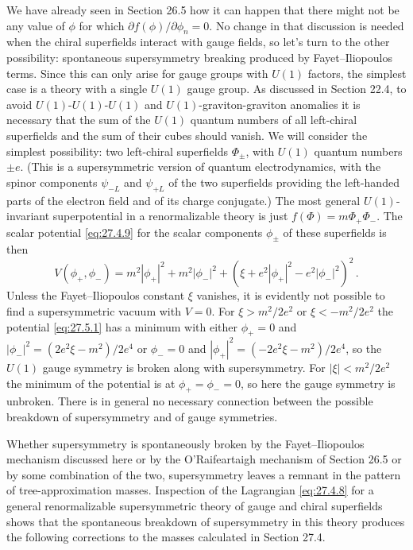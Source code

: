 We have already seen in Section 26.5 how it can happen that there might not
be any value of \(\phi\) for which \(\partial f(\phi)/\partial\phi_n=0\).
No change in that discussion is needed when the chiral superfields interact
with gauge fields, so let's turn to the other possibility: spontaneous
supersymmetry breaking produced by Fayet--Iliopoulos terms. Since this can
only arise for gauge groups with \(U(1)\) factors, the simplest case is a
theory with a single \(U(1)\) gauge group. As discussed in Section 22.4, to
avoid \(U(1)\)-\(U(1)\)-\(U(1)\) and \(U(1)\)-graviton-graviton anomalies
it is necessary that the sum of the \(U(1)\) quantum numbers of all
left-chiral superfields and the sum of their cubes should vanish. We will
consider the simplest possibility: two left-chiral superfields \(\Phi_\pm\),
with \(U(1)\) quantum numbers \(\pm e\). (This is a supersymmetric version
of quantum electrodynamics, with the spinor components \(\psi_{-L}\) and
\(\psi_{+L}\) of the two superfields providing the left-handed parts of the
electron field and of its charge conjugate.) The most general
\(U(1)\)-invariant superpotential in a renormalizable theory is just
\(f(\Phi)=m\Phi_+\Phi_-\). The scalar potential \eqref{eq:27.4.9} for the
scalar components \(\phi_\pm\) of these superfields is then
\begin{equation}
  V(\phi_+,\phi_-)
  =m^2|\phi_+|^2+m^2|\phi_-|^2
  +\left(\xi+e^2|\phi_+|^2-e^2|\phi_-|^2\right)^2\,.
  \tag{27.5.1}\label{eq:27.5.1}
\end{equation}
Unless the Fayet--Iliopoulos constant \(\xi\) vanishes, it is evidently not
possible to find a supersymmetric vacuum with \(V=0\). For
\(\xi>m^2/2e^2\) or \(\xi<-m^2/2e^2\) the potential \eqref{eq:27.5.1} has
a minimum with either \(\phi_+=0\) and
\(|\phi_-|^2=(2e^2\xi-m^2)/2e^4\) or \(\phi_-=0\) and
\(|\phi_+|^2=(-2e^2\xi-m^2)/2e^4\), so the \(U(1)\) gauge symmetry is
broken along with supersymmetry. For \(|\xi|<m^2/2e^2\) the minimum of the
potential is at \(\phi_+=\phi_-=0\), so here the gauge symmetry is unbroken.
There is in general no necessary connection between the possible breakdown
of supersymmetry and of gauge symmetries.

Whether supersymmetry is spontaneously broken by the Fayet--Iliopoulos
mechanism discussed here or by the O'Raifeartaigh mechanism of Section 26.5
or by some combination of the two, supersymmetry leaves a remnant in the
pattern of tree-approximation masses. Inspection of the Lagrangian
\eqref{eq:27.4.8} for a general renormalizable supersymmetric theory of gauge
and chiral superfields shows that the spontaneous breakdown of
supersymmetry in this theory produces the following corrections to the
masses calculated in Section 27.4.

